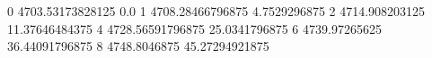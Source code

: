0 4703.53173828125 0.0
1 4708.28466796875 4.7529296875
2 4714.908203125 11.37646484375
4 4728.56591796875 25.0341796875
6 4739.97265625 36.44091796875
8 4748.8046875 45.27294921875
